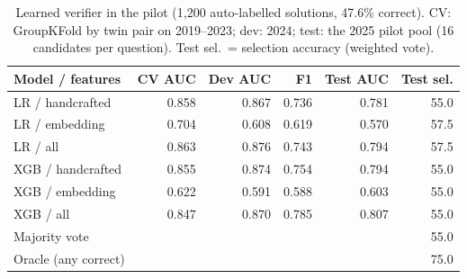 \begin{table}[t]
\centering
\footnotesize
\caption{Learned verifier in the pilot (1,200 auto-labelled solutions, 47.6\% correct). CV: GroupKFold by twin pair on 2019--2023; dev: 2024; test: the 2025 pilot pool (16 candidates per question). Test sel.\ = selection accuracy (weighted vote).}
\label{tab:verifier}
\setlength{\tabcolsep}{3.5pt}
\begin{tabular}{lrrrrr}
\toprule
Model / features & CV AUC & Dev AUC & F1 & Test AUC & Test sel. \\
\midrule
LR / handcrafted & 0.858 & 0.867 & 0.736 & 0.781 & 55.0 \\
LR / embedding & 0.704 & 0.608 & 0.619 & 0.570 & 57.5 \\
LR / all & 0.863 & 0.876 & 0.743 & 0.794 & 57.5 \\
XGB / handcrafted & 0.855 & 0.874 & 0.754 & 0.794 & 55.0 \\
XGB / embedding & 0.622 & 0.591 & 0.588 & 0.603 & 55.0 \\
XGB / all & 0.847 & 0.870 & 0.785 & 0.807 & 55.0 \\
Majority vote &  &  &  &  & 55.0 \\
Oracle (any correct) &  &  &  &  & 75.0 \\
\bottomrule
\end{tabular}
\end{table}
